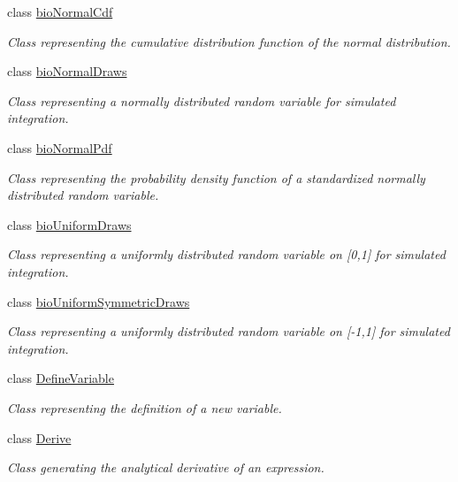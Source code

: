 \begin{DoxyCompactItemize}
class \hyperlink{classbio__expression_1_1bio_normal_cdf}{bio\+Normal\+Cdf}
\begin{DoxyCompactList}\small\item\em Class representing the cumulative distribution function of the normal distribution. \end{DoxyCompactList}\item 
class \hyperlink{classbio__expression_1_1bio_normal_draws}{bio\+Normal\+Draws}
\begin{DoxyCompactList}\small\item\em Class representing a normally distributed random variable for simulated integration. \end{DoxyCompactList}\item 
class \hyperlink{classbio__expression_1_1bio_normal_pdf}{bio\+Normal\+Pdf}
\begin{DoxyCompactList}\small\item\em Class representing the probability density function of a standardized normally distributed random variable. \end{DoxyCompactList}\item 
class \hyperlink{classbio__expression_1_1bio_uniform_draws}{bio\+Uniform\+Draws}
\begin{DoxyCompactList}\small\item\em Class representing a uniformly distributed random variable on \mbox{[}0,1\mbox{]} for simulated integration. \end{DoxyCompactList}\item 
class \hyperlink{classbio__expression_1_1bio_uniform_symmetric_draws}{bio\+Uniform\+Symmetric\+Draws}
\begin{DoxyCompactList}\small\item\em Class representing a uniformly distributed random variable on \mbox{[}-\/1,1\mbox{]} for simulated integration. \end{DoxyCompactList}\item 
class \hyperlink{classbio__expression_1_1_define_variable}{Define\+Variable}
\begin{DoxyCompactList}\small\item\em Class representing the definition of a new variable. \end{DoxyCompactList}\item 
class \hyperlink{classbio__expression_1_1_derive}{Derive}
\begin{DoxyCompactList}\small\item\em Class generating the analytical derivative of an expression. \end{DoxyCompactList}\item 

\end{DoxyCompactItemize}

